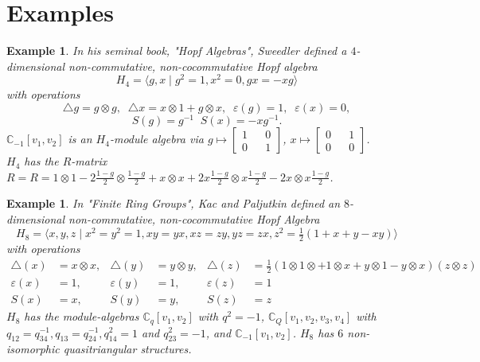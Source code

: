 \documentclass[12pt,a4paper]{article}
\newtheorem{example}[theorem]{Example}
\newcommand\1{_{(1)}}
\newcommand\2{_{(2)}}
\begin{document}
\section{Examples}

\begin{example}
    In his seminal book, "Hopf Algebras", Sweedler defined a $4$-dimensional non-commutative, non-cocommutative Hopf algebra
    \[
    H_4=\langle g,x\;\vert\; g^2=1, x^2=0,gx=-xg\rangle
    \]
    with operations
    \[
    \triangle{g}=g\otimes g,\;\; \triangle{x}=x\otimes 1+g\otimes x,\;\;\varepsilon(g)=1,\;\;\varepsilon(x)=0,
    \]
    \[
    S(g)=g^{-1}\;\;S(x)=-xg^{-1}.
    \]
   $\mathbb{C}_{-1}[v_1,v_2]$ is an $H_4$-module algebra via $g\mapsto \begin{bmatrix} 1&&0\\0&&1\end{bmatrix}$, $x\mapsto\begin{bmatrix} 0&&1\\0&&0\end{bmatrix}$.
   \\$H_4$ has the $R$-matrix $R= R=1\otimes 1-2\tfrac{1-g}{2}\otimes\tfrac{1-g}{2}+x\otimes x+2x\tfrac{1-g}{2}\otimes x\tfrac{1-g}{2}-2x\otimes x\tfrac{1-g}{2}$.
\end{example}

\begin{example}
 In "Finite Ring Groups", Kac and Paljutkin defined an $8$-dimensional non-commutative, non-cocommutative Hopf Algebra
 \[
   H_8=\langle x,y,z\;\vert\; x^2=y^2=1,xy=yx,xz=zy,yz=zx,z^2=\tfrac{1}{2}(1+x+y-xy)\rangle 
 \]
 with operations
 \begin{align*}
   \triangle(x)&=x\otimes x, & \triangle(y)&=y\otimes y, & \triangle(z)&=\tfrac{1}{2}(1\otimes 1\otimes +1\otimes x+y\otimes 1-y\otimes x)(z\otimes z)\\
   \varepsilon(x)&=1, & \varepsilon(y)&=1, & \varepsilon(z)&=1\\
   S(x)&=x, & S(y)&=y, & S(z)&=z
 \end{align*}
$H_8$ has the module-algebras $\mathbb{C}_q[v_1,v_2]$ with $q^2=-1$, $\mathbb{C}_Q[v_1,v_2,v_3,v_4]$ with $q_{12}=q_{34}^{-1}, q_{13}=q_{24}^{-1}, q_{14}^2=1$ and $q_{23}^2=-1$, and $\mathbb{C}_{-1}[v_1,v_2]$.
$H_8$ has $6$ non-isomorphic quasitriangular structures.
\end{example}
\end{document}
